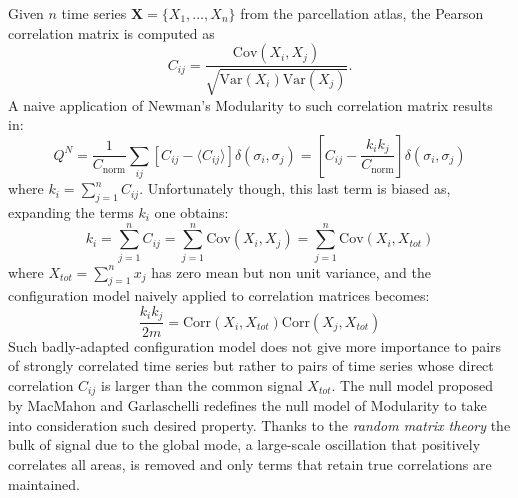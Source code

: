 Given $n$ time series $\mathbf{X}=\{ X_1, \ldots, X_n\}$ from the parcellation atlas, the Pearson correlation matrix is computed as
\begin{equation}
C_{ij} = \frac{\textrm{Cov}(X_i,X_j)}{\sqrt{\textrm{Var}(X_i)\textrm{Var}(X_j) }}.
\end{equation}
A naive application of Newman's Modularity to such correlation matrix results in:
\begin{equation}
Q^N= \frac{1}{C_{\textrm{norm}}} \sum \limits_{ij} \left[ C_{ij} - \langle C_{ij} \rangle \right] \delta(\sigma_i,\sigma_j) = \left[ C_{ij} - \frac{k_i k_j}{C_{\textrm{norm}}} \right] \delta(\sigma_i,\sigma_j)
\end{equation}
where $k_i=\sum_{j=1}^n C_{ij}$. Unfortunately though, this last term is biased as, expanding the terms $k_i$ one obtains:
\begin{equation}
k_i =\sum_{j=1}^n C_{ij}= \sum_{j=1}^n \textrm{Cov}(X_i,X_j) = \sum_{j=1}^n \textrm{Cov}(X_i,X_{tot})
\end{equation}
where $X_{tot}=\sum_{j=1}^n x_j$ has zero mean but non unit variance, and the configuration model naively applied to correlation matrices becomes:
\begin{equation}
\frac{k_i k_j}{2m} = \textrm{Corr}(X_i,X_{tot})\textrm{Corr}(X_j,X_{tot})
\end{equation}
Such badly-adapted configuration model does not give more importance to pairs of strongly correlated time series but rather to pairs of time series whose direct correlation $C_{ij}$ is larger than the common signal $X_{tot}$.
The null model proposed by MacMahon and Garlaschelli redefines the null model of Modularity to take into consideration such desired property. Thanks to the \emph{random matrix theory} the bulk of signal due to the global mode, a large-scale oscillation that positively correlates all areas, is removed and only terms that retain true correlations are maintained.